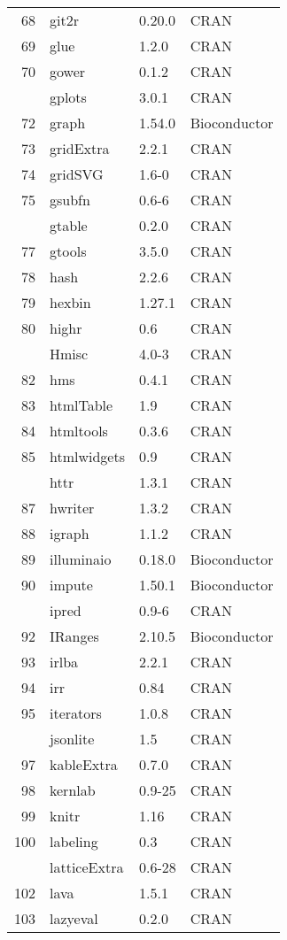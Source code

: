 \begin{longtable}{rlll}
68 & git2r & 0.20.0 & CRAN\\
69 & glue & 1.2.0 & CRAN\\
70 & gower & 0.1.2 & CRAN\\
\addlinespace
71 & gplots & 3.0.1 & CRAN\\
72 & graph & 1.54.0 & Bioconductor\\
73 & gridExtra & 2.2.1 & CRAN\\
74 & gridSVG & 1.6-0 & CRAN\\
75 & gsubfn & 0.6-6 & CRAN\\
\addlinespace
76 & gtable & 0.2.0 & CRAN\\
77 & gtools & 3.5.0 & CRAN\\
78 & hash & 2.2.6 & CRAN\\
79 & hexbin & 1.27.1 & CRAN\\
80 & highr & 0.6 & CRAN\\
\addlinespace
81 & Hmisc & 4.0-3 & CRAN\\
82 & hms & 0.4.1 & CRAN\\
83 & htmlTable & 1.9 & CRAN\\
84 & htmltools & 0.3.6 & CRAN\\
85 & htmlwidgets & 0.9 & CRAN\\
\addlinespace
86 & httr & 1.3.1 & CRAN\\
87 & hwriter & 1.3.2 & CRAN\\
88 & igraph & 1.1.2 & CRAN\\
89 & illuminaio & 0.18.0 & Bioconductor\\
90 & impute & 1.50.1 & Bioconductor\\
\addlinespace
91 & ipred & 0.9-6 & CRAN\\
92 & IRanges & 2.10.5 & Bioconductor\\
93 & irlba & 2.2.1 & CRAN\\
94 & irr & 0.84 & CRAN\\
95 & iterators & 1.0.8 & CRAN\\
\addlinespace
96 & jsonlite & 1.5 & CRAN\\
97 & kableExtra & 0.7.0 & CRAN\\
98 & kernlab & 0.9-25 & CRAN\\
99 & knitr & 1.16 & CRAN\\
100 & labeling & 0.3 & CRAN\\
\addlinespace
101 & latticeExtra & 0.6-28 & CRAN\\
102 & lava & 1.5.1 & CRAN\\
103 & lazyeval & 0.2.0 & CRAN\\

\end{longtable}
